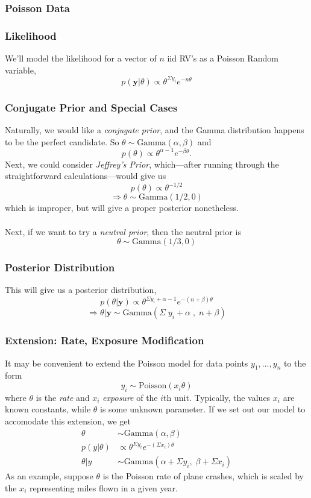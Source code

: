 \documentclass[12pt]{article}
\theoremstyle{plain}
\theoremstyle{definition}
\theoremstyle{remark}
\begin{document}
\newpage
\subsubsection{Poisson Data}

\subsubsection{Likelihood}

We'll model the likelihood for a vector of $n$ iid RV's as a
Poisson Random variable,
   \[ p(\mathbf{y} | \theta) \propto \theta^{\Sigma y_i} e^{-n\theta} \]

\subsubsection{Conjugate Prior and Special Cases}

Naturally, we would like a \emph{conjugate prior}, and the Gamma
distribution
happens to be the perfect candidate.
So $\theta \sim \text{Gamma}(\alpha,
\beta)$ and
   \[ p(\theta) \propto \theta^{\alpha - 1} e^{-\beta \theta}.\]
Next, we could consider \emph{Jeffrey's Prior},
which---after running through
the straightforward calculations---would give us
   \[ p(\theta) \propto \theta^{-1/2} \]
   \[ \Rightarrow \theta \sim \text{Gamma}(1/2, 0) \]
which is improper, but will give a proper posterior nonetheless.
\\
\\
Next, if we want to try a \emph{neutral prior}, then the neutral prior
is
   \[ \theta \sim \text{Gamma}(1/3, 0) \]


\subsubsection{Posterior Distribution}

This will give us a posterior distribution,
   \[ p(\theta | \mathbf{y}) \propto \theta^{ \Sigma y_i + \alpha
      - 1} e^{-(n+ \beta) \theta} \]
   \[ \Rightarrow \theta | \mathbf{y} \sim \text{Gamma}( \Sigma \; y_i
      + \alpha \; , \; n + \beta ) \]


\subsubsection{Extension: Rate, Exposure Modification}
It may be convenient to extend
the Poisson model for data points $y_1, \ldots, y_n$ to the form
   \[ y_i \sim \text{Poisson}(x_i\theta) \]
where $\theta$ is the \emph{rate} and $x_i$ \emph{exposure} of the
$i$th unit. Typically, the values $x_i$ are known constants, while
$\theta$ is some unknown parameter. If we set out our model to
accomodate this extension, we get
\begin{align*}
   \theta &\sim \text{Gamma}(\alpha, \beta) \\
   p(y|\theta) &\propto \theta^{\Sigma y_i} e^{-(\Sigma x_i)\theta}\\
   \theta | y &\sim \text{Gamma}\left( \alpha + \Sigma y_i, \;
      \beta + \Sigma x_i\right)
\end{align*}
As an example, suppose $\theta$ is the Poisson rate of plane crashes,
which is scaled by the $x_i$ representing miles flown in a given year.
\end{document}
